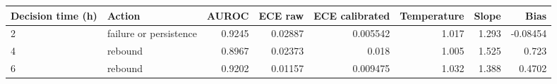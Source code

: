 \begin{tabular}{llrrrrrr}
\toprule
Decision time (h) & Action & AUROC & ECE raw & ECE calibrated & Temperature & Slope & Bias \\
\midrule
2 & failure or persistence & 0.9245 & 0.02887 & 0.005542 & 1.017 & 1.293 & -0.08454 \\
4 & rebound & 0.8967 & 0.02373 & 0.018 & 1.005 & 1.525 & 0.723 \\
6 & rebound & 0.9202 & 0.01157 & 0.009475 & 1.032 & 1.388 & 0.4702 \\
\bottomrule
\end{tabular}
